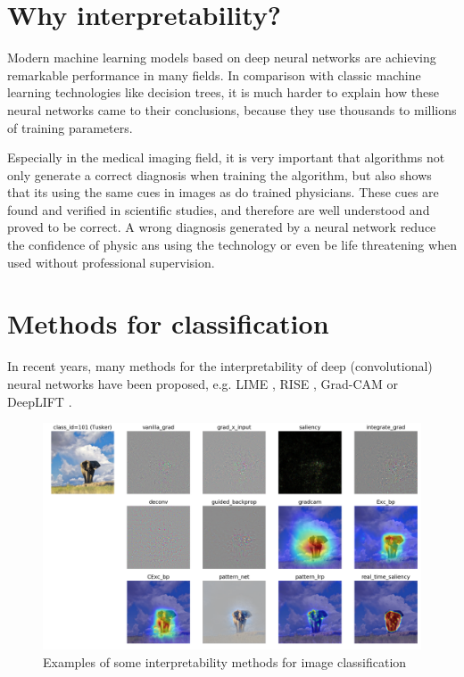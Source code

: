 \section{Why interpretability?}
Modern machine learning models based on deep neural networks are achieving remarkable performance in many fields. In comparison with classic machine learning technologies like decision trees, it is much harder to explain how these neural networks came to their conclusions, because they use thousands to millions of training parameters.

Especially in the medical imaging field, it is very important that algorithms not only generate a correct diagnosis when training the algorithm, but also shows that its using the same cues in images as do trained physicians. These cues are found and verified in scientific studies, and therefore are well understood and proved to be correct. A wrong diagnosis generated by a neural network reduce the confidence of physic ans using the technology or even be life threatening when used without professional supervision.

\section{Methods for classification}
In recent years, many methods for the interpretability of deep (convolutional) neural networks have been proposed, e.g. LIME \cite{ribeiro2016should}, RISE \cite{Petsiuk2018rise}, Grad-CAM \cite{selvaraju2017grad} or DeepLIFT \cite{shrikumar2017learning}.

\begin{figure}[h]
\centering
\caption{Examples of some interpretability methods for image classification \cite{visualattribution}}
\includegraphics[width=14cm]{images/tusker_saliency.png}
\end{figure}

